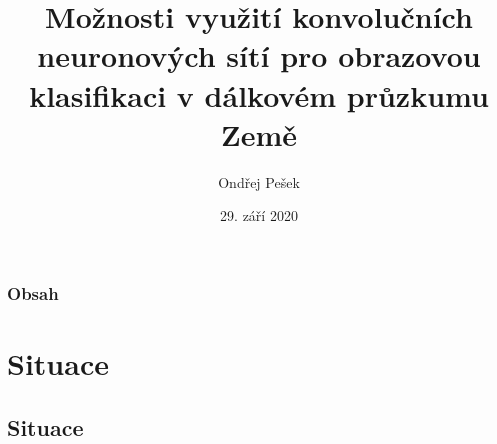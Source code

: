 \documentclass[10pt, t]{beamer}
\title[]{Možnosti využití konvolučních neuronových sítí pro obrazovou klasifikaci v dálkovém průzkumu Země} %
\author{Ondřej Pešek} %
\institute[CTU] %
{
České vysoké učení technické v Praze \\ %
Fakulta stavební \\
Obor Geomatika
}
\date{29. září 2020} %
\begin{document}
\begin{frame}
\titlepage %
\end{frame}

\begin{frame}
\frametitle{Obsah} %
\tableofcontents %
\end{frame}


\section{Situace} %


\subsection{Situace}

\end{document}
